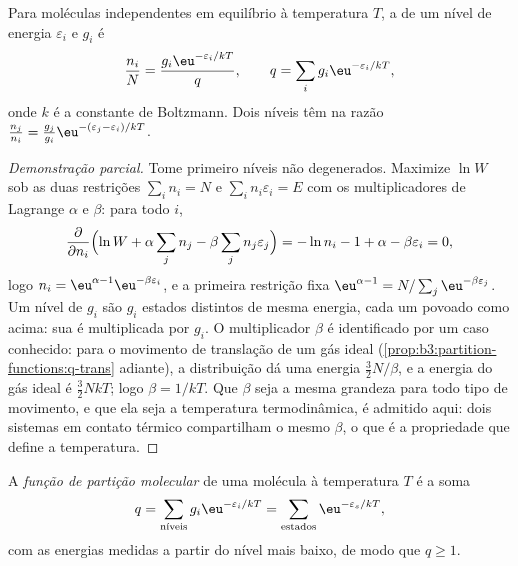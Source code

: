 \begin{theorem}\label{thm:b3:partition-functions:boltzmann}
Para moléculas independentes em equilíbrio à temperatura $T$, a  de um
nível de energia $\varepsilon_i$ e  $g_i$ é
\[
  \frac{n_i}{N} = \frac{g_i\eu^{-\varepsilon_i/kT}}{q},
  \qquad q = \sum_i g_i\eu^{-\varepsilon_i/kT},
\]
onde $k$ é a constante de Boltzmann. Dois níveis têm  na razão
$\frac{n_j}{n_i} = \frac{g_j}{g_i}\eu^{-(\varepsilon_j - \varepsilon_i)/kT}$.
\end{theorem}

\begin{proof}[Demonstração parcial]
Tome primeiro níveis não degenerados. Maximize $\ln W$ sob as duas restrições
$\sum_in_i = N$ e $\sum_in_i\varepsilon_i = E$ com os multiplicadores de Lagrange $\alpha$ e $\beta$:
para todo $i$,
\[
  \frac{\partial}{\partial n_i}\Bigl(\ln W + \alpha\sum_jn_j - \beta\sum_jn_j\varepsilon_j\Bigr)
  = -\ln n_i - 1 + \alpha - \beta\varepsilon_i = 0,
\]
logo $n_i = \eu^{\alpha - 1}\eu^{-\beta\varepsilon_i}$, e a primeira restrição fixa $\eu^{\alpha - 1}
= N/\sum_j\eu^{-\beta\varepsilon_j}$. Um nível de  $g_i$ são $g_i$ estados distintos de
mesma energia, cada um povoado como acima: sua  é multiplicada por
$g_i$. O multiplicador $\beta$ é identificado por um caso conhecido: para o
movimento de translação de um gás ideal (\cref{prop:b3:partition-functions:q-trans}
adiante), a distribuição dá uma energia $\frac32N/\beta$, e a energia do gás
ideal é $\frac32NkT$; logo $\beta = 1/kT$. Que $\beta$ seja a mesma grandeza para todo
tipo de movimento, e que ela seja a temperatura termodinâmica, é admitido
aqui: dois sistemas em contato térmico compartilham o mesmo $\beta$, o que é a
propriedade que define a temperatura.
\end{proof}

\begin{definition}\label{def:b3:partition-functions:partition-function}
A \emph{função de partição molecular} de uma
molécula à temperatura $T$ é a soma
\[
  q = \sum_{\text{níveis}}g_i\eu^{-\varepsilon_i/kT} = \sum_{\text{estados}}\eu^{-\varepsilon_s/kT},
\]
com as energias medidas a partir do nível mais baixo, de modo que $q \ge 1$.
\end{definition}

